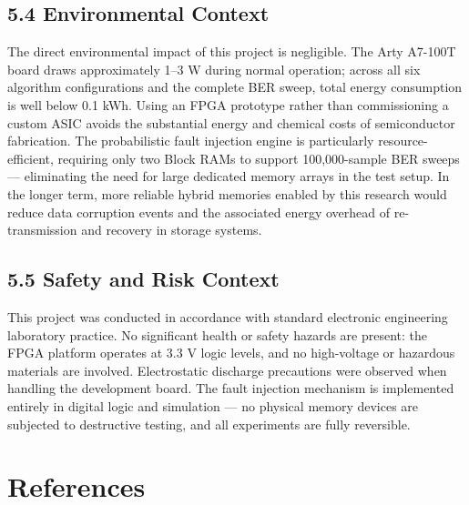 \documentclass[
  12pt,
  a4paper]{report}
\begin{document}
\section{5.4 Environmental Context}\label{environmental-context}

The direct environmental impact of this project is negligible. The Arty
A7-100T board draws approximately 1--3 W during normal operation; across
all six algorithm configurations and the complete BER sweep, total
energy consumption is well below 0.1 kWh. Using an FPGA prototype rather
than commissioning a custom ASIC avoids the substantial energy and
chemical costs of semiconductor fabrication. The probabilistic fault
injection engine is particularly resource-efficient, requiring only two
Block RAMs to support 100,000-sample BER sweeps --- eliminating the need
for large dedicated memory arrays in the test setup. In the longer term,
more reliable hybrid memories enabled by this research would reduce data
corruption events and the associated energy overhead of re-transmission
and recovery in storage systems.

\section{5.5 Safety and Risk Context}\label{safety-and-risk-context}

This project was conducted in accordance with standard electronic
engineering laboratory practice. No significant health or safety hazards
are present: the FPGA platform operates at 3.3 V logic levels, and no
high-voltage or hazardous materials are involved. Electrostatic
discharge precautions were observed when handling the development board.
The fault injection mechanism is implemented entirely in digital logic
and simulation --- no physical memory devices are subjected to
destructive testing, and all experiments are fully reversible.

\chapter{References}\label{references}
\end{document}
